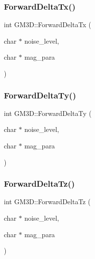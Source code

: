 \mbox{\label{class_g_m3_d_a0e3cb604502cf6364f6651072f4d74de}} 
\subsubsection{\texorpdfstring{ForwardDeltaTx()}{ForwardDeltaTx()}}
{\footnotesize\ttfamily int G\+M3\+D\+::\+Forward\+Delta\+Tx (\begin{DoxyParamCaption}\item[{char $\ast$}]{noise\+\_\+level,  }\item[{char $\ast$}]{mag\+\_\+para }\end{DoxyParamCaption})}

\mbox{\label{class_g_m3_d_a74b622173016857a6538f2ac525eca65}} 
\subsubsection{\texorpdfstring{ForwardDeltaTy()}{ForwardDeltaTy()}}
{\footnotesize\ttfamily int G\+M3\+D\+::\+Forward\+Delta\+Ty (\begin{DoxyParamCaption}\item[{char $\ast$}]{noise\+\_\+level,  }\item[{char $\ast$}]{mag\+\_\+para }\end{DoxyParamCaption})}

\mbox{\label{class_g_m3_d_a54e8e678674572a08fb25d9baa8b0173}} 
\subsubsection{\texorpdfstring{ForwardDeltaTz()}{ForwardDeltaTz()}}
{\footnotesize\ttfamily int G\+M3\+D\+::\+Forward\+Delta\+Tz (\begin{DoxyParamCaption}\item[{char $\ast$}]{noise\+\_\+level,  }\item[{char $\ast$}]{mag\+\_\+para }\end{DoxyParamCaption})}

\mbox{\label{class_g_m3_d_a333535886227e8bc3e7aa377037b872b}} 
